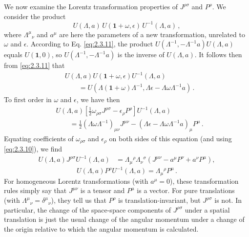 We now examine the Lorentz transformation properties of $J^{\rho\sigma}$ and
$P^\rho$. We consider the product
\[
U(\Lambda,a)\,U(\mathbf{1}+\omega,\epsilon)\,U^{-1}(\Lambda,a)\,,
\]
where $\Lambda^\mu{}_{\nu}$ and $a^\mu$ are here the parameters of a new
transformation, unrelated to $\omega$ and $\epsilon$. According to Eq.
\eqref{eq:2.3.11}, the product $U(\Lambda^{-1},-\Lambda^{-1}a)U(\Lambda,a)$ equals
$U(\mathbf{1},0)$, so $U(\Lambda^{-1},-\Lambda^{-1}a)$ is the inverse of $U(\Lambda,a)$.
It follows then from \eqref{eq:2.3.11} that
\begin{equation}
\begin{split}
&U(\Lambda,a)U(\mathbf{1}+\omega,\epsilon)U^{-1}(\Lambda,a)\\
&\qquad={}
U\!\left(\Lambda(\mathbf{1}+\omega)\Lambda^{-1},
\Lambda\epsilon-\Lambda\omega\Lambda^{-1}a\right)\,.
\end{split}
\tag{2.4.6}\label{eq:2.4.6}
\end{equation}
To first order in $\omega$ and $\epsilon$, we have then
\begin{equation}
\begin{split}
&U(\Lambda,a)
\left[\frac12\omega_{\rho\sigma}J^{\rho\sigma}
-\epsilon_\rho P^\rho\right]U^{-1}(\Lambda,a)\\
&\qquad={}
\frac12(\Lambda\omega\Lambda^{-1})_{\mu\nu}J^{\mu\nu}
-(\Lambda\epsilon-\Lambda\omega\Lambda^{-1}a)_\mu P^\mu\,.
\end{split}
\tag{2.4.7}\label{eq:2.4.7}
\end{equation}
Equating coefficients of $\omega_{\rho\sigma}$ and $\epsilon_\rho$ on both
sides of this equation (and using \eqref{eq:2.3.10}), we find
\begin{equation}
\begin{aligned}
U(\Lambda,a)J^{\rho\sigma}U^{-1}(\Lambda,a)
&=\Lambda_\mu{}^\rho\Lambda_\nu{}^\sigma\left(J^{\mu\nu}-a^\mu P^\nu+a^\nu P^\mu\right),
\end{aligned}
\tag{2.4.8}\label{eq:2.4.8}
\end{equation}
\begin{equation}
U(\Lambda,a)P^\rho U^{-1}(\Lambda,a)
=\Lambda_\mu{}^\rho P^\mu\,.
\tag{2.4.9}\label{eq:2.4.9}
\end{equation}
For homogeneous Lorentz transformations (with $a^\mu=0$), these
transformation rules simply say that $J^{\mu\nu}$ is a tensor and $P^\mu$ is a
vector. For pure translations (with $\Lambda^\mu{}_{\nu}=\delta^\mu{}_{\nu}$),
they tell us that $P^\rho$ is translation-invariant, but $J^{\rho\sigma}$ is
not. In particular, the change of the space-space components of
$J^{\rho\sigma}$ under a spatial translation is just the usual change of the
angular momentum under a change of the origin relative to which the angular
momentum is calculated.

